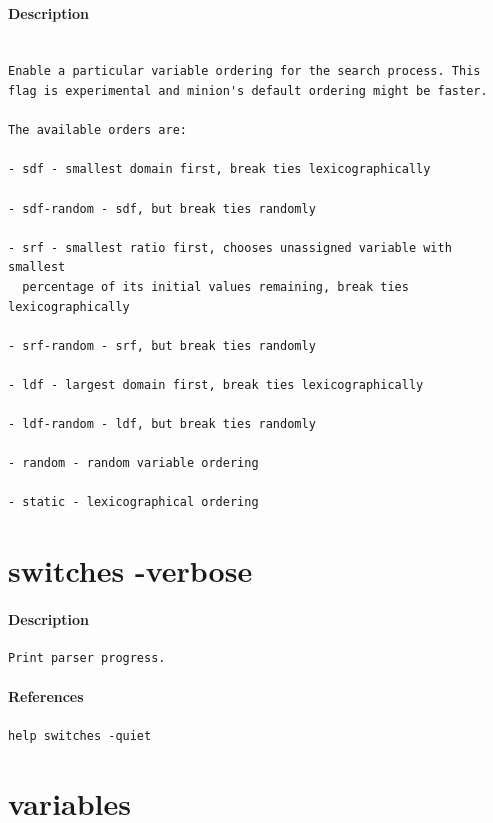 \documentclass[oneside]{book}
\begin{document}
\paragraph{Description}
{\footnotesize
\begin{verbatim}

Enable a particular variable ordering for the search process. This
flag is experimental and minion's default ordering might be faster.

The available orders are:

- sdf - smallest domain first, break ties lexicographically

- sdf-random - sdf, but break ties randomly

- srf - smallest ratio first, chooses unassigned variable with smallest
  percentage of its initial values remaining, break ties lexicographically

- srf-random - srf, but break ties randomly

- ldf - largest domain first, break ties lexicographically

- ldf-random - ldf, but break ties randomly

- random - random variable ordering

- static - lexicographical ordering
\end{verbatim}
}
\section{switches -verbose}
\paragraph{Description}
{\footnotesize
\begin{verbatim}
Print parser progress.
\end{verbatim}
}
\paragraph{References}
{\footnotesize
\begin{verbatim}
help switches -quiet
\end{verbatim}
}
\section{variables}
\end{document}
